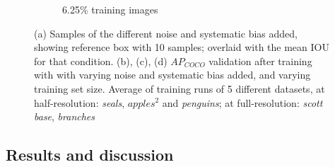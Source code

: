 \begin{figure}[phbt!]
\begin{subfigure}[t]{0.5\linewidth}
  \caption{6.25\% training images}
\end{subfigure}
  \caption{ (a) Samples of the different noise and systematic bias added, showing reference box with 10 samples; overlaid with the mean \gls{IOU} for that condition. (b), (c), (d) $AP_{COCO}$ validation after training with with varying noise and systematic bias added, and varying training set size. Average of training runs of 5 different datasets, at half-resolution: \emph{seals}, $apples^2$ and \emph{penguins}; at full-resolution: \emph{scott base}, \emph{branches}}
  \label{fig:noisy_training}
\end{figure}

\subsection{Results and discussion}

